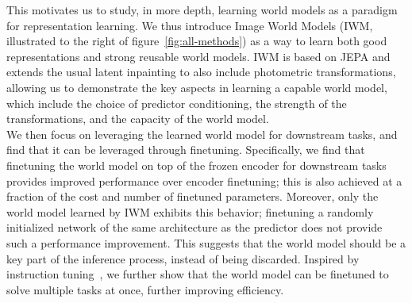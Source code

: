 \documentclass[twocolumn]{fairmeta}
\theoremstyle{plain}
\theoremstyle{definition}
\theoremstyle{remark}
\begin{document}
This motivates us to study, in more depth, learning world models as a paradigm for representation learning. 
We thus introduce Image World Models (IWM, illustrated to the right of figure~\ref{fig:all-methods}) as a way to learn both good representations and strong reusable world models.
IWM is based on JEPA and extends the usual latent inpainting to also include photometric transformations, allowing us to demonstrate the key aspects in learning a capable world model, which include the choice of predictor conditioning, the strength of the transformations, and the capacity of the world model.\\
We then focus on leveraging the learned world model for downstream tasks, and find that it can be leveraged through finetuning.
Specifically, we find that finetuning the world model on top of the frozen encoder for downstream tasks provides improved performance over encoder finetuning; this is also achieved at a fraction of the cost and number of finetuned parameters.
Moreover, only the world model learned by IWM exhibits this behavior; finetuning a randomly initialized network of the same architecture as the predictor does not provide such a performance improvement.
This suggests that the world model should be a key part of the inference process, instead of being discarded.
Inspired by instruction tuning~\citep{wei2022instruction,zhang2023instruction}, we further show that the world model can be finetuned to solve multiple tasks at once, further improving efficiency.
\end{document}
